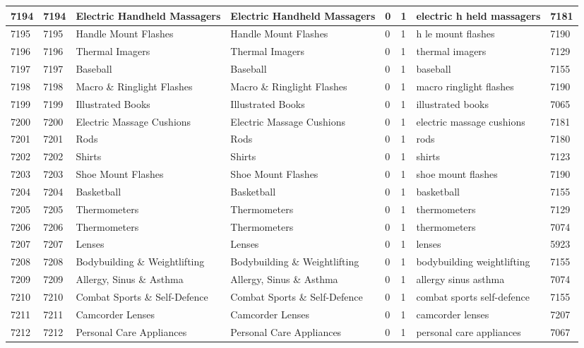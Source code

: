 \begin{longtable}{|l|l|l|l|l|l|l|l|}
7194 & 7194 & Electric Handheld Massagers & Electric Handheld Massagers & 0 & 1 & electric h held massagers & 7181 \\ \hline 
7195 & 7195 & Handle Mount Flashes & Handle Mount Flashes & 0 & 1 & h le mount flashes & 7190 \\ \hline 
7196 & 7196 & Thermal Imagers & Thermal Imagers & 0 & 1 & thermal imagers & 7129 \\ \hline 
7197 & 7197 & Baseball & Baseball & 0 & 1 & baseball & 7155 \\ \hline 
7198 & 7198 & Macro \& Ringlight Flashes & Macro \& Ringlight Flashes & 0 & 1 & macro ringlight flashes & 7190 \\ \hline 
7199 & 7199 & Illustrated Books & Illustrated Books & 0 & 1 & illustrated books & 7065 \\ \hline 
7200 & 7200 & Electric Massage Cushions & Electric Massage Cushions & 0 & 1 & electric massage cushions & 7181 \\ \hline 
7201 & 7201 & Rods & Rods & 0 & 1 & rods & 7180 \\ \hline 
7202 & 7202 & Shirts & Shirts & 0 & 1 & shirts & 7123 \\ \hline 
7203 & 7203 & Shoe Mount Flashes & Shoe Mount Flashes & 0 & 1 & shoe mount flashes & 7190 \\ \hline 
7204 & 7204 & Basketball & Basketball & 0 & 1 & basketball & 7155 \\ \hline 
7205 & 7205 & Thermometers & Thermometers & 0 & 1 & thermometers & 7129 \\ \hline 
7206 & 7206 & Thermometers & Thermometers & 0 & 1 & thermometers & 7074 \\ \hline 
7207 & 7207 & Lenses & Lenses & 0 & 1 & lenses & 5923 \\ \hline 
7208 & 7208 & Bodybuilding \& Weightlifting & Bodybuilding \& Weightlifting & 0 & 1 & bodybuilding weightlifting & 7155 \\ \hline 
7209 & 7209 & Allergy, Sinus \& Asthma & Allergy, Sinus \& Asthma & 0 & 1 & allergy sinus asthma & 7074 \\ \hline 
7210 & 7210 & Combat Sports \& Self-Defence & Combat Sports \& Self-Defence & 0 & 1 & combat sports self-defence & 7155 \\ \hline 
7211 & 7211 & Camcorder Lenses & Camcorder Lenses & 0 & 1 & camcorder lenses & 7207 \\ \hline 
7212 & 7212 & Personal Care Appliances & Personal Care Appliances & 0 & 1 & personal care appliances & 7067 \\ \hline 

\end{longtable}
